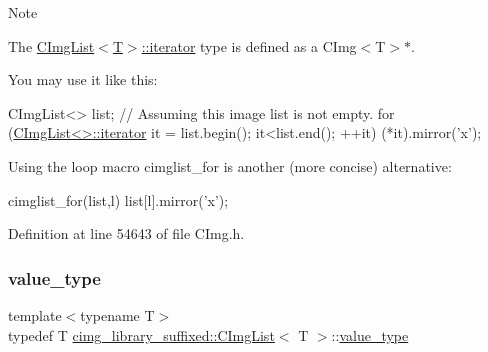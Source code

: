 \begin{DoxyNote}{Note}

\begin{DoxyItemize}
\item The {\ttfamily \hyperlink{structcimg__library__suffixed_1_1CImgList_a9d3e27da63f536e04fc7249f8e13dba0}{C\+Img\+List$<$\+T$>$\+::iterator}} type is defined as a {\ttfamily C\+Img$<$\+T$>$$\ast$}.
\item You may use it like this\+: 
\begin{DoxyCode}
CImgList<> list;   \textcolor{comment}{// Assuming this image list is not empty.}
\textcolor{keywordflow}{for} (\hyperlink{structcimg__library__suffixed_1_1CImgList_a9d3e27da63f536e04fc7249f8e13dba0}{CImgList<>::iterator} it = list.begin(); it<list.end(); ++it) (*it).mirror(\textcolor{charliteral}{'x'});
\end{DoxyCode}

\item Using the loop macro {\ttfamily cimglist\+\_\+for} is another (more concise) alternative\+: 
\begin{DoxyCode}
cimglist\_for(list,l) list[l].mirror(\textcolor{charliteral}{'x'});
\end{DoxyCode}
 
\end{DoxyItemize}
\end{DoxyNote}


Definition at line 54643 of file C\+Img.\+h.

\mbox{\label{structcimg__library__suffixed_1_1CImgList_a41c952483793b049e58c27e11d0dd955}} 
\subsubsection{\texorpdfstring{value\+\_\+type}{value\_type}}
{\footnotesize\ttfamily template$<$typename T$>$ \\
typedef T \hyperlink{structcimg__library__suffixed_1_1CImgList}{cimg\+\_\+library\+\_\+suffixed\+::\+C\+Img\+List}$<$ T $>$\+::\hyperlink{structcimg__library__suffixed_1_1CImgList_a41c952483793b049e58c27e11d0dd955}{value\+\_\+type}}



